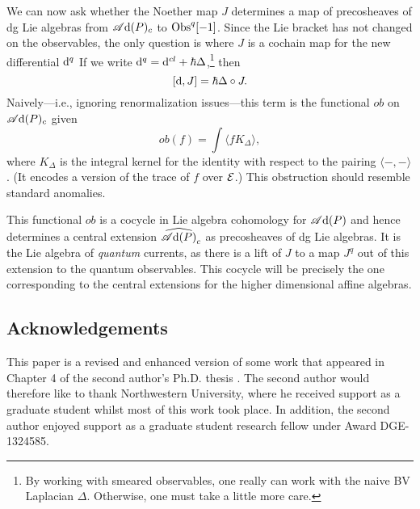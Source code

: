 We can now ask whether the Noether map $J$ determines a map of precosheaves of dg Lie algebras from $\mathscr A{\rm d}(P)_c$ to ${\rm Obs}^q[-1]$.
Since the Lie bracket has not changed on the observables, 
the only question is where $J$ is a cochain map for the new differential ${\rm d}^q$
If we write ${\rm d}^q = {\rm d}^{cl} + \hbar \Delta$,\footnote{By working with smeared observables, one really can work with the naive BV Laplacian $\Delta$. Otherwise, one must take a little more care.} then 
\[
[{\rm d},J] = \hbar \Delta \circ J.
\]
Naively---i.e., ignoring renormalization issues---this term is the functional $ob$ on $\mathscr A{\rm d}(P)_c$ given 
\[
ob(f) = \int \langle f K_\Delta \rangle,
\]
where $K_\Delta$ is the integral kernel for the identity with respect to the pairing $\langle-,-\rangle$.
(It encodes a version of the trace of $f$ over $\mathcal E$.)
This obstruction should resemble standard anomalies.

This functional $ob$ is a cocycle in Lie algebra cohomology for $\mathscr A{\rm d}(P)$ and hence determines a central extension $\widehat{\mathscr A{\rm d}(P)}_c$ as precosheaves of dg Lie algebras.
It is the Lie algebra of {\em quantum} currents, as there is a lift of $J$ to a map $J^q$ out of this extension to the quantum observables.
This cocycle will be precisely the one corresponding to the central extensions for the higher dimensional affine algebras. 

\subsection*{Acknowledgements}
This paper is a revised and enhanced version of some work that appeared in Chapter 4 of the second author's Ph.D. thesis \cite{BWthesis}. 
The second author would therefore like to thank Northwestern University, where he received support as a graduate student whilst most of this work took place.
In addition, the second author enjoyed support as a graduate student research fellow under Award DGE-1324585. 

